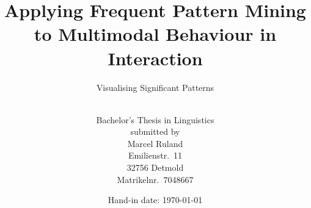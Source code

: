 \documentclass[
	DIV=calc,				%
	BCOR=0mm,				%
	pagesize,				%
	toc=bib,				%
	toc=listof,				%
	abstract=true,			%
	twoside,				%
	titlepage=firstiscover,	%
	footnotes=multiple		%
]{scrreprt}
\title{%
	{Applying Frequent Pattern Mining to Multimodal Behaviour in Interaction}
}
\subtitle{Visualising Significant Patterns}
\author{~\\[1em]
	{Bachelor's Thesis in Linguistics} \\
	submitted by \\[0.2em]
	{\LARGE\addfontfeature{Style=Alternate} Marcel Ruland} \\[0.2em]
	Emilienstr.~11 \\
	32756 Detmold \\
	Matrikelnr.~7048667
}
\date{Hand-in date: \today}
\begin{document}
{\singlespacing
\maketitle
%
\tableofcontents}






%
%
\listoftables
\listoffigures
\singlespacing

\end{document}
